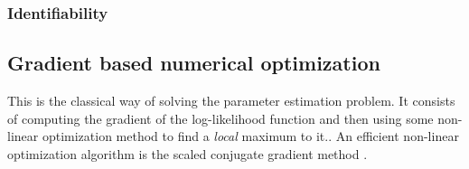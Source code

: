 \subsubsection{Identifiability}
\parencite{Haykin2001,Cappe2005}

\subsection{Gradient based numerical optimization}\label{sec:grad}

This is the classical way of solving the parameter estimation problem. It consists
of computing the gradient of the log-likelihood function and then using some
non-linear optimization method to find a \emph{local} maximum to it.\parencite{Mbalawataa}. 
An efficient non-linear optimization algorithm is the scaled 
conjugate gradient method \parencite{Mbalawataa}.

